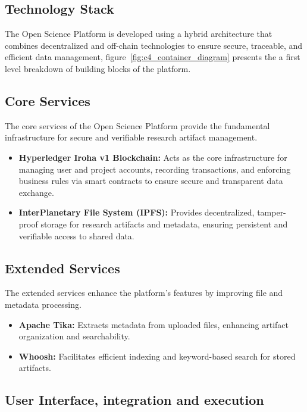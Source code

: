 \documentclass{article}
\begin{document}
\subsection{Technology Stack}
The Open Science Platform is developed using a hybrid architecture that combines decentralized and off-chain technologies to ensure secure, traceable, and efficient data management, figure~\ref{fig:c4_container_diagram} presents the a first level breakdown of building blocks of the platform.

\subsection{Core Services}

The core services of the Open Science Platform provide the fundamental infrastructure for secure and verifiable research artifact management.

\begin{itemize}
      \item \textbf{Hyperledger Iroha v1 Blockchain:} Acts as the core infrastructure for managing user and project accounts, recording transactions, and enforcing business rules via smart contracts to ensure secure and transparent data exchange.
      \item \textbf{InterPlanetary File System (IPFS):} Provides decentralized, tamper-proof storage for research artifacts and metadata, ensuring persistent and verifiable access to shared data.
\end{itemize}

\subsection{Extended Services}

The extended services enhance the platform's features by improving file and metadata processing.

\begin{itemize}
      \item \textbf{Apache Tika:} Extracts metadata from uploaded files, enhancing artifact organization and searchability.
      \item \textbf{Whoosh:} Facilitates efficient indexing and keyword-based search for stored artifacts.
\end{itemize}


\subsection{User Interface, integration and execution}
\end{document}
